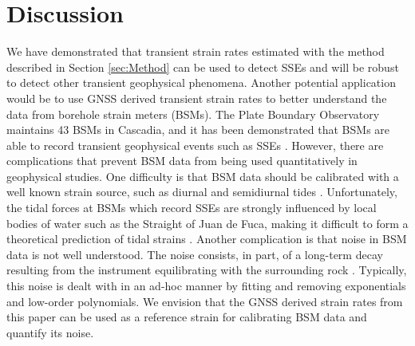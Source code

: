\documentclass[extra,mreferee]{gji}
\begin{document}
\section{Discussion}\label{sec:Discussion}
We have demonstrated that transient strain rates estimated with the method described in Section \ref{sec:Method} can be used to detect SSEs and will be robust to detect other transient geophysical phenomena. Another potential application would be to use GNSS derived transient strain rates to better understand the data from borehole strain meters (BSMs). The Plate Boundary Observatory maintains 43 BSMs in Cascadia, and it has been demonstrated that BSMs are able to record transient geophysical events such as SSEs \citep[e.g.,][]{Dragert2011}. However, there are complications that prevent BSM data from being used quantitatively in geophysical studies. One difficulty is that BSM data should be calibrated with a well known strain source, such as diurnal and semidiurnal tides \citep{Hart1996,Roeloffs2010,Hodgkinson2013}. Unfortunately, the tidal forces at BSMs which record SSEs are strongly influenced by local bodies of water such as the Straight of Juan de Fuca, making it difficult to form a theoretical prediction of tidal strains \citep{Roeloffs2010}. Another complication is that noise in BSM data is not well understood. The noise consists, in part, of a long-term decay resulting from the instrument equilibrating with the surrounding rock \citep{Gladwin1987}. Typically, this noise is dealt with in an ad-hoc manner by fitting and removing exponentials and low-order polynomials. We envision that the GNSS derived strain rates from this paper can be used as a reference strain for calibrating BSM data and quantify its noise.    
\end{document}
